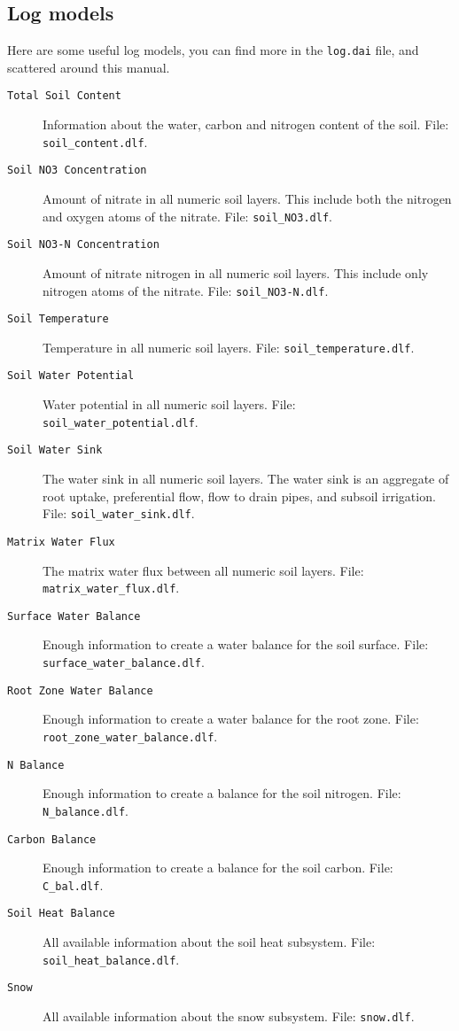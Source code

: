\documentclass[a4paper,11pt]{article}
\begin{document}
\subsection{Log models}
\label{sec:log-models}

Here are some useful log models, you can find more in the
\texttt{log.dai} file, and scattered around this manual.
\begin{description}
\item[\texttt{Total Soil Content}] Information about the water, carbon
  and nitrogen content of the soil.  File: \texttt{soil\_content.dlf}.
\item[\texttt{Soil NO3 Concentration}] Amount of nitrate in all
  numeric soil layers.  This include both the nitrogen and oxygen
  atoms of the nitrate.  File: \texttt{soil\_NO3.dlf}.
\item[\texttt{Soil NO3-N Concentration}] Amount of nitrate nitrogen in
  all numeric soil layers.  This include only nitrogen atoms of the
  nitrate.  File: \texttt{soil\_NO3-N.dlf}.
\item[\texttt{Soil Temperature}] Temperature in all numeric soil
  layers. File: \texttt{soil\_temperature.dlf}.
\item[\texttt{Soil Water Potential}] Water potential in all numeric
  soil layers.  File: \texttt{soil\_water\_potential.dlf}.
\item[\texttt{Soil Water Sink}] The water sink in all numeric soil
  layers.  The water sink is an aggregate of root uptake, preferential
  flow, flow to drain pipes, and subsoil irrigation.  File:
  \texttt{soil\_water\_sink.dlf}.
\item[\texttt{Matrix Water Flux}] The matrix water flux between all
  numeric soil layers.  File: \texttt{matrix\_water\_flux.dlf}.
\item[\texttt{Surface Water Balance}] Enough information to create a
  water balance for the soil surface.  File:
  \texttt{surface\_water\_balance.dlf}.
\item[\texttt{Root Zone Water Balance}] Enough information to create a
  water balance for the root zone.  File:
  \texttt{root\_zone\_water\_balance.dlf}. 
\item[\texttt{N Balance}] Enough information to create a balance for
  the soil nitrogen.  File: \texttt{N\_balance.dlf}.
\item[\texttt{Carbon Balance}] Enough information to create a balance for
  the soil carbon.  File: \texttt{C\_bal.dlf}.
\item[\texttt{Soil Heat Balance}] All available information about the
  soil heat subsystem.  File: \texttt{soil\_heat\_balance.dlf}.
\item[\texttt{Snow}] All available information about the snow
  subsystem.  File: \texttt{snow.dlf}.
\end{description}
\end{document}
